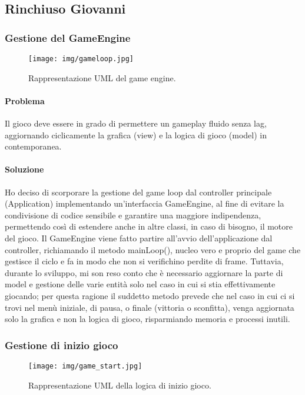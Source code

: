 \subsection{Rinchiuso Giovanni}

\subsubsection{Gestione del GameEngine}

\begin{figure}[H]
\centering{}
\texttt{[image: img/gameloop.jpg]}
\caption{Rappresentazione UML del game engine.}
\end{figure}

\paragraph{Problema} Il gioco deve essere in grado di permettere un gameplay fluido senza lag, aggiornando ciclicamente la grafica (view) e la logica di gioco (model) in contemporanea.

\paragraph{Soluzione} Ho deciso di scorporare la gestione del game loop dal controller principale (Application) implementando un’interfaccia GameEngine, al fine di evitare la condivisione di codice sensibile e garantire una maggiore indipendenza, permettendo così di estendere anche in altre classi, in caso di bisogno, il motore del gioco. Il GameEngine viene fatto partire all’avvio dell’applicazione dal controller, richiamando il metodo mainLoop(), nucleo vero e proprio del game che gestisce il ciclo e fa in modo che non si verifichino perdite di frame. Tuttavia, durante lo sviluppo, mi son reso conto che è necessario aggiornare la parte di model e gestione delle varie entità solo nel caso in cui si stia effettivamente giocando; per questa ragione il suddetto metodo prevede che nel caso in cui ci si trovi nel menù iniziale, di pausa, o finale (vittoria o sconfitta), venga aggiornata solo la grafica e non la logica di gioco, risparmiando memoria e processi inutili.

\subsubsection{Gestione di inizio gioco}

\begin{figure}[H]
\centering{}
\texttt{[image: img/game\_start.jpg]}
\caption{Rappresentazione UML della logica di inizio gioco.}
\end{figure}

